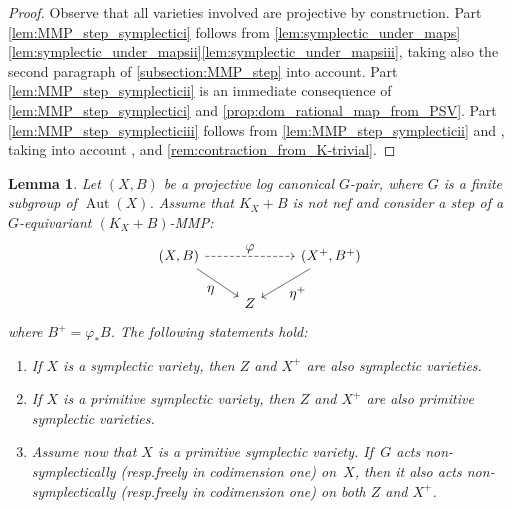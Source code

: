 \documentclass[10pt]{amsart}
\newcommand{\resp}{resp.}
\let\ts\textstyle
\theoremstyle{plain}
\newtheorem{lem}[thm]{Lemma}
\theoremstyle{definition}
\DeclareMathOperator{\Aut}{Aut}
\begin{document}
\begin{proof}
Observe that all varieties involved are projective by construction. Part \eqref{lem:MMP_step_symplectici} follows from \autoref{lem:symplectic_under_maps}\eqref{lem:symplectic_under_mapsii}\eqref{lem:symplectic_under_mapsiii}, taking also the second paragraph of \autoref{subsection:MMP_step} into account. Part \eqref{lem:MMP_step_symplecticii} is an immediate consequence of \eqref{lem:MMP_step_symplectici} and \autoref{prop:dom_rational_map_from_PSV}. Part \eqref{lem:MMP_step_symplecticiii} follows from \eqref{lem:MMP_step_symplecticii} and \cite[Cor.\,1]{Nam06}, taking into account \cite[Lem.\,3.38]{KM98}, \cite[Prop.\,4.8.20]{Fuj17book} and \autoref{rem:contraction_from_K-trivial}.
\end{proof}

\begin{lem}
\label{lem:G-equivariant_MMP_step_symplectic}
Let $(X,B)$ be a projective log canonical $G$\nobreakdash-pair, where $G$ is a finite subgroup of $\Aut(X)$. Assume that $K_X+B$ is not nef and consider a step of a $G$\nobreakdash-equiva\-riant $(K_X+B)$-MMP:
\[
\begin{tikzcd}
(X, B) \arrow[dr, "\ts \eta" swap] \arrow[rr, "\ts \varphi", dashed] && (X^+, B^+) \arrow[dl, "\ts \eta^+"] \\
& Z
\end{tikzcd}
\]
where $B^+ = \varphi_* B$. The following statements hold:
\begin{enumerate}
\item\label{lem:G-equivariant_MMP_step_symplectici}
If $X$ is a symplectic variety, then $Z$ and $X^+$ are also symplectic varieties.

\item\label{lem:G-equivariant_MMP_step_symplecticii}
If $X$ is a primitive symplectic variety, then $Z$ and $X^+$ are also primitive symplectic varieties.

\item\label{lem:G-equivariant_MMP_step_symplecticiii}
Assume now that $X$ is a primitive symplectic variety. If~$G$ acts non-symplecti\-cally (\resp freely in codimension one) on~$X$, then it also acts non-symplectically (\resp freely in codimension one) on both $Z$ and $X^+$.
\end{enumerate}
\end{lem}
\end{document}
